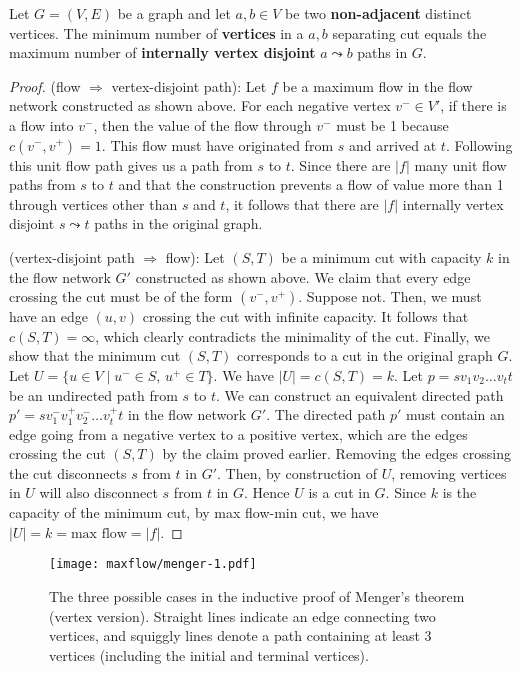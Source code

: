 \begin{theorem} 
    Let $G=(V,E)$ be a graph and let $a,b \in V$ be two \textbf{non-adjacent} distinct vertices. The minimum number of \textbf{vertices} in a $a,b$ separating cut equals the maximum number of \textbf{internally vertex disjoint} $a \leadsto b$ paths in $G$.
\end{theorem}

\begin{proof}
    \hfill

    (flow $\Rightarrow$ vertex-disjoint path): Let $f$ be a maximum flow in the flow network constructed as shown above. For each negative vertex $v^- \in V'$, if there is a flow into $v^-$, then the value of the flow through $v^-$ must be 1 because $c(v^-,v^+)=1$. This flow must have originated from $s$ and arrived at $t$. Following this unit flow path gives us a path from $s$ to $t$. Since there are $|f|$ many unit flow paths from $s$ to $t$ and that the construction prevents a flow of value more than 1 through vertices other than $s$ and $t$, it follows that there are $|f|$ internally vertex disjoint $s \leadsto t$ paths in the original graph.

    (vertex-disjoint path $\Rightarrow$ flow): Let $(S,T)$ be a minimum cut with capacity $k$ in the flow network $G'$ constructed as shown above. We claim that every edge crossing the cut must be of the form $(v^-,v^+)$. Suppose not. Then, we must have an edge $(u,v)$ crossing the cut with infinite capacity. It follows that $c(S,T) = \infty$, which clearly contradicts the minimality of the cut. Finally, we show that the minimum cut $(S,T)$ corresponds to a cut in the original graph $G$. Let $U = \{u \in V \mid u^- \in S,\, u^+ \in T\}$. We have $|U| = c(S,T) = k$. Let $p = sv_1v_2\ldots v_t t$ be an undirected path from $s$ to $t$. We can construct an equivalent directed path $p' = s v_1^- v_1^+ v_2^- \ldots v_t^+ t$ in the flow network $G'$. The directed path $p'$ must contain an edge going from a negative vertex to a positive vertex, which are the edges crossing the cut $(S,T)$ by the claim proved earlier. Removing the edges crossing the cut disconnects $s$ from $t$ in $G'$. Then, by construction of $U$, removing vertices in $U$ will also disconnect $s$ from $t$ in $G$. Hence $U$ is a cut in $G$. Since $k$ is the capacity of the minimum cut, by max flow-min cut, we have $|U| = k = \text{max flow} = |f|$.
\end{proof}

\begin{figure}[htbp]
    \centering
    \texttt{[image: maxflow/menger-1.pdf]}
    \caption{The three possible cases in the inductive proof of Menger's theorem (vertex version). Straight lines indicate an edge connecting two vertices, and squiggly lines denote a path containing at least 3 vertices (including the initial and terminal vertices).}
    \label{fig:menger-undirected-1}
\end{figure}